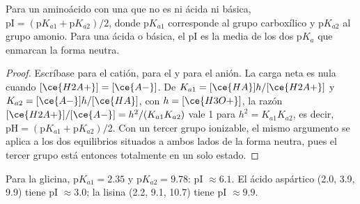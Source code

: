 \begin{proposition}\label{prop:b2:biomolecules:pi}
Para un aminoácido con una  que no es ni ácida ni básica, $\mathrm{pI} = (\mathrm pK_{a1} +
\mathrm pK_{a2})/2$, donde $\mathrm pK_{a1}$ corresponde al grupo carboxílico y $\mathrm pK_{a2}$ al
grupo amonio. Para una  ácida o básica, el pI es la media de los dos $\mathrm pK_a$ que enmarcan la
forma neutra.
\end{proposition}

\begin{proof}
Escríbase  para el catión,  para el  y  para el anión. La carga neta es
nula cuando $[\ce{H2A+}] = [\ce{A-}]$. De $K_{a1} = [\ce{HA}]h/[\ce{H2A+}]$ y $K_{a2} =
[\ce{A-}]h/[\ce{HA}]$, con $h = [\ce{H3O+}]$, la razón $[\ce{H2A+}]/[\ce{A-}] = h^2/(K_{a1}K_{a2})$
vale 1 para $h^2 = K_{a1}K_{a2}$, es decir, $\mathrm{pH} = (\mathrm pK_{a1} + \mathrm pK_{a2})/2$. Con un
tercer grupo ionizable, el mismo argumento se aplica a los dos equilibrios situados a ambos lados de la forma
neutra, pues el tercer grupo está entonces totalmente en un solo estado.
\end{proof}

Para la glicina, $\mathrm pK_{a1} = 2.35$ y $\mathrm pK_{a2} = 9.78$: pI $\approx 6.1$. El ácido aspártico
(2.0, 3.9, 9.9) tiene pI $\approx 3.0$; la lisina (2.2, 9.1, 10.7) tiene pI $\approx 9.9$.

